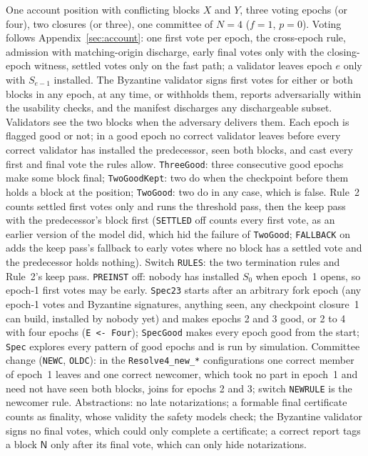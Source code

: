 \documentclass[conference]{IEEEtran}
\newcommand{\tagN}{\mathsf{N}}
\begin{document}
One account position with conflicting blocks $X$ and $Y$, three voting epochs (or four), two closures (or three), one committee of $N=4$ ($f=1$, $p=0$). Voting follows Appendix~\ref{sec:account}: one first vote per epoch, the cross-epoch rule, admission with matching-origin discharge, early final votes only with the closing-epoch witness, settled votes only on the fast path; a validator leaves epoch $e$ only with $S_{e-1}$ installed. The Byzantine validator signs first votes for either or both blocks in any epoch, at any time, or withholds them, reports adversarially within the usability checks, and the manifest discharges any dischargeable subset. Validators see the two blocks when the adversary delivers them. Each epoch is flagged good or not; in a good epoch no correct validator leaves before every correct validator has installed the predecessor, seen both blocks, and cast every first and final vote the rules allow. \texttt{ThreeGood}: three consecutive good epochs make some block final; \texttt{TwoGoodKept}: two do when the checkpoint before them holds a block at the position; \texttt{TwoGood}: two do in any case, which is false. Rule~2 counts settled first votes only and runs the threshold pass, then the keep pass with the predecessor's block first (\texttt{SETTLED} off counts every first vote, as an earlier version of the model did, which hid the failure of \texttt{TwoGood}; \texttt{FALLBACK} on adds the keep pass's fallback to early votes where no block has a settled vote and the predecessor holds nothing). Switch \texttt{RULES}: the two termination rules and Rule~2's keep pass. \texttt{PREINST} off: nobody has installed $S_0$ when epoch~1 opens, so epoch-1 first votes may be early. \texttt{Spec23} starts after an arbitrary fork epoch (any epoch-1 votes and Byzantine signatures, anything seen, any checkpoint closure~1 can build, installed by nobody yet) and makes epochs 2 and 3 good, or 2 to 4 with four epochs (\texttt{E <- Four}); \texttt{SpecGood} makes every epoch good from the start; \texttt{Spec} explores every pattern of good epochs and is run by simulation. Committee change (\texttt{NEWC}, \texttt{OLDC}): in the \texttt{Resolve4\_new\_*} configurations one correct member of epoch~1 leaves and one correct newcomer, which took no part in epoch~1 and need not have seen both blocks, joins for epochs 2 and 3; switch \texttt{NEWRULE} is the newcomer rule. Abstractions: no late notarizations; a formable final certificate counts as finality, whose validity the safety models check; the Byzantine validator signs no final votes, which could only complete a certificate; a correct report tags a block $\tagN$ only after its final vote, which can only hide notarizations.
\end{document}
